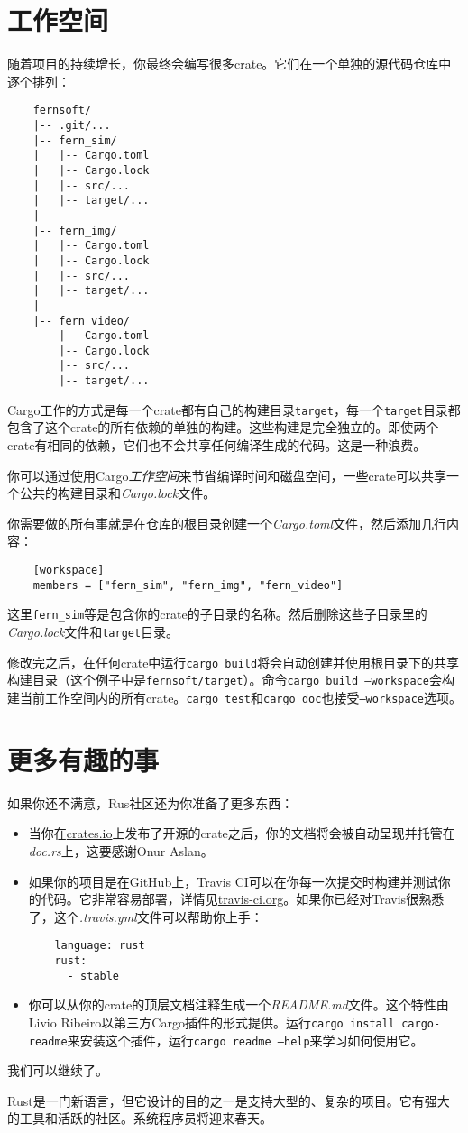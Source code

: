 \section{工作空间}

随着项目的持续增长，你最终会编写很多crate。它们在一个单独的源代码仓库中逐个排列：
\begin{verbatim}
    fernsoft/
    |-- .git/...
    |-- fern_sim/
    |   |-- Cargo.toml
    |   |-- Cargo.lock
    |   |-- src/...
    |   |-- target/...
    |
    |-- fern_img/
    |   |-- Cargo.toml
    |   |-- Cargo.lock
    |   |-- src/...
    |   |-- target/...
    |
    |-- fern_video/
        |-- Cargo.toml
        |-- Cargo.lock
        |-- src/...
        |-- target/...
\end{verbatim}

Cargo工作的方式是每一个crate都有自己的构建目录\texttt{target}，每一个\texttt{target}目录都包含了这个crate的所有依赖的单独的构建。这些构建是完全独立的。即使两个crate有相同的依赖，它们也不会共享任何编译生成的代码。这是一种浪费。

你可以通过使用Cargo\emph{工作空间}来节省编译时间和磁盘空间，一些crate可以共享一个公共的构建目录和\emph{Cargo.lock}文件。

你需要做的所有事就是在仓库的根目录创建一个\emph{Cargo.toml}文件，然后添加几行内容：
\begin{verbatim}
    [workspace]
    members = ["fern_sim", "fern_img", "fern_video"]
\end{verbatim}
这里\texttt{fern\_sim}等是包含你的crate的子目录的名称。然后删除这些子目录里的\emph{Cargo.lock}文件和\texttt{target}目录。

修改完之后，在任何crate中运行\texttt{cargo build}将会自动创建并使用根目录下的共享构建目录（这个例子中是\texttt{fernsoft/target}）。命令\texttt{cargo build --workspace}会构建当前工作空间内的所有crate。\texttt{cargo test}和\texttt{cargo doc}也接受\texttt{--workspace}选项。

\section{更多有趣的事}

如果你还不满意，Rus社区还为你准备了更多东西：
\begin{itemize}
    \item 当你在\href{https://crates.io}{crates.io}上发布了开源的crate之后，你的文档将会被自动呈现并托管在\emph{doc.rs}上，这要感谢Onur Aslan。
    \item 如果你的项目是在GitHub上，Travis CI可以在你每一次提交时构建并测试你的代码。它非常容易部署，详情见\href{https://travis-ci.org}{travis-ci.org}。如果你已经对Travis很熟悉了，这个\emph{.travis.yml}文件可以帮助你上手：
    \begin{verbatim}
    language: rust
    rust:
      - stable
    \end{verbatim}
    \item 你可以从你的crate的顶层文档注释生成一个\emph{README.md}文件。这个特性由Livio Ribeiro以第三方Cargo插件的形式提供。运行\texttt{cargo install cargo-readme}来安装这个插件，运行\texttt{cargo readme --help}来学习如何使用它。
\end{itemize}

我们可以继续了。

Rust是一门新语言，但它设计的目的之一是支持大型的、复杂的项目。它有强大的工具和活跃的社区。系统程序员将迎来春天。
